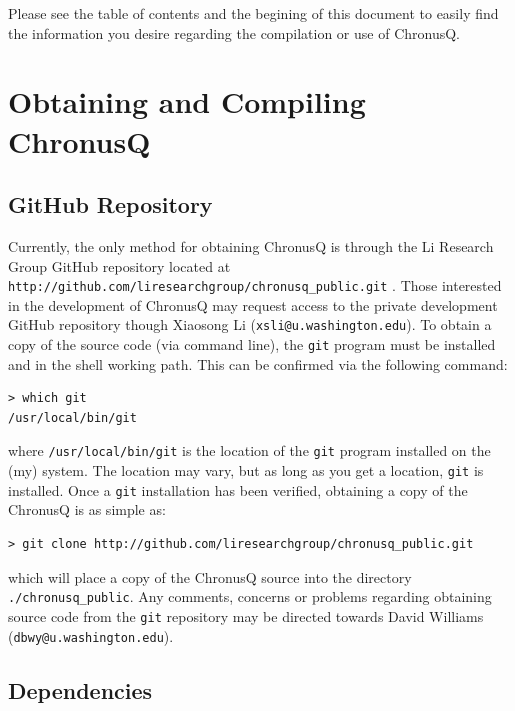 \documentclass[12pt]{article}
\makeatletter
\newcommand{\ChronusQGitHubPUBLIC}{
  \texttt{http://github.com/liresearchgroup/chronusq\_public.git}
}
\newcommand{\XiaosongContact}{Xiaosong Li (\texttt{xsli@u.washington.edu})}
\newcommand{\DBWYContact}{David Williams (\texttt{dbwy@u.washington.edu})}
\makeatother
\begin{document}
  Please see the table of contents and the begining of this document to easily find
  the information you desire regarding the compilation or use of ChronusQ.

  \section{Obtaining and Compiling ChronusQ} \label{sec:ObtainAndCompile}
    \subsection{GitHub Repository} \label{subsec:ChronusQGitHub}

    Currently, the only method for obtaining ChronusQ is through the Li Research
    Group GitHub repository located at \ChronusQGitHubPUBLIC. Those interested in
    the development of ChronusQ may request access to the private development GitHub
    repository though \XiaosongContact. To obtain a copy of the source code (via 
    command line), the \texttt{git} program must be installed and in the shell 
    working path. This can be confirmed via the following command:

    \begin{lstlisting}
> which git
/usr/local/bin/git
    \end{lstlisting}

    \noindent where \texttt{/usr/local/bin/git} is the location of the \texttt{git} 
    program installed on the (my) system. The location may vary, but as long as 
    you get a location, \texttt{git} is installed. Once a \texttt{git} 
    installation has been verified, obtaining a copy of the ChronusQ is as 
    simple as:

    \begin{lstlisting}
> git clone http://github.com/liresearchgroup/chronusq_public.git
    \end{lstlisting}
    
    \noindent which will place a copy of the ChronusQ source into the directory 
    \texttt{./chronusq\_public}. Any comments, concerns or problems regarding 
    obtaining source code from the \texttt{git} repository may be directed 
    towards \DBWYContact. 

    \subsection{Dependencies} \label{subsec:ChronusQDeps}
\end{document}
